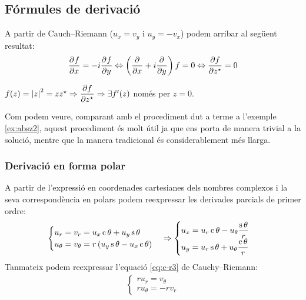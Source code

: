 \subsection{Fórmules de derivació}
A partir de Cauch--Riemann ($u_{x} = v_{y}$ i $u_{y} = - v_{x}$) podem arribar al següent resultat:
\begin{align}
    \frac{\partial^{}f}{\partial x^{}} = - i \frac{\partial^{}f}{\partial y^{}} \Leftrightarrow \left( \frac{\partial^{}}{\partial x^{}} + i \frac{\partial^{}}{\partial y^{}} \right) f = 0 \Leftrightarrow \frac{\partial f}{\partial z^{\star}} = 0
\end{align}

\begin{example}
    $f(z) = \left| z \right|^{2} = z z^{\star} \Rightarrow \dfrac{\partial f}{\partial z^{\star}} \Rightarrow \exists f'(z)$ només per $z = 0$.
    
    Com podem veure, comparant amb el procediment dut a terme a l'exemple \ref{ex:absz2}, aquest procediment és molt útil ja que ens porta de manera trivial a la solució, mentre que la manera tradicional és considerablement més llarga.
\end{example}

\subsubsection*{Derivació en forma polar}
A partir de l'expressió en coordenades cartesianes dels nombres complexos i la seva correspondència en polars podem reexpressar les derivades parcials de primer ordre:
\begin{align}
    \begin{cases} u_{r} = v_{r} = u_{x} \operatorname{c} \theta + u_{y} \operatorname{s} \theta \\ u_{\theta} = v_{\theta} = r \left( u_{y} \operatorname{s} \theta - u_{x} \operatorname{c} \theta \right) \end{cases} \Rightarrow \begin{cases} u_{x} = u_{r} \operatorname{c} \theta - u_{\theta} \dfrac{\operatorname{s} \theta}{r} \\ u_{y} = u_{r} \operatorname{s} \theta + u_{\theta} \dfrac{\operatorname{c} \theta}{r} \end{cases} 
\end{align}
Tanmateix podem reexpressar l'equació \eqref{eq:c-r3} de Cauchy--Riemann:
\begin{align}
    \begin{cases}r u_{r} = v_{\theta} \\ r u_{\theta} = - r v_{r} \end{cases}
\end{align}

